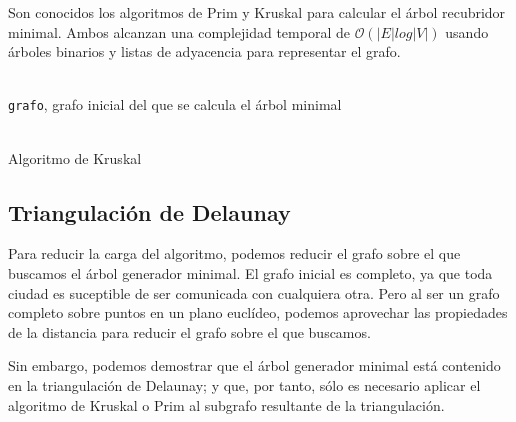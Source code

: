 \documentclass[a4paper, 11pt]{article} %
\let\emptyset\varnothing
\begin{document}
    Son conocidos los algoritmos de Prim y Kruskal para calcular el árbol recubridor minimal. Ambos alcanzan una
    complejidad temporal de $\mathcal{O}(|E|log|V|)$ usando árboles binarios y listas de adyacencia para
    representar el grafo.
    
    \begin{algorithm}[H]
	\begin{algorithmic}[1]
		\REQUIRE \ \\
        	\texttt{grafo}, grafo inicial del que se calcula el árbol minimal \\\
		\STATE{\texttt{árbol=}$\emptyset$}
		\ENDFOR
		    \ENDIF
		\ENDFOR
	\end{algorithmic}
      \caption{Algoritmo de Kruskal}
      \label{kruskal}
    \end{algorithm}

  
    
  \subsection{Triangulación de Delaunay}
    Para reducir la carga del algoritmo, podemos reducir el grafo sobre el que buscamos el árbol generador minimal.
    El grafo inicial es completo, ya que toda ciudad es suceptible de ser comunicada con cualquiera otra. Pero al 
    ser un grafo completo sobre puntos en un plano euclídeo, podemos aprovechar las propiedades de la distancia para
    reducir el grafo sobre el que buscamos.
    
    Sin embargo, podemos demostrar que el árbol generador minimal está contenido en la triangulación de Delaunay; y que, por tanto, sólo es necesario aplicar el algoritmo de Kruskal o Prim
    al subgrafo resultante de la triangulación.
    
\end{document}
